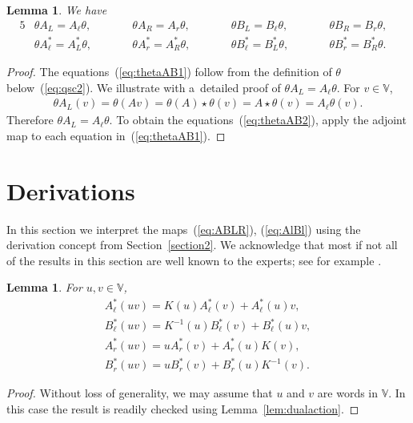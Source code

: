 \documentclass[11pt]{article}
\numberwithin{equation}{section}
\numberwithin{equation}{section}
\newtheorem{Lemma}[Theorem]{Lemma}
\begin{document}
{\begin{Lemma}\label{lem:thetaAB}We have
\begin{alignat}{5}
&\theta A_L = A_\ell \theta,
\qquad &&
\theta A_R = A_r \theta,
\qquad &&
\theta B_L = B_\ell \theta,
\qquad &&
\theta B_R = B_r \theta,&
\label{eq:thetaAB1}
\\
& \theta A^*_\ell = A^*_L \theta,
\qquad &&
\theta A^*_r = A^*_R \theta,
\qquad &&
\theta B^*_\ell = B^*_L \theta,
\qquad &&
\theta B^*_r = B^*_R \theta.&\label{eq:thetaAB2}
\end{alignat}
\end{Lemma}
\begin{proof} The equations~(\ref{eq:thetaAB1}) follow from the definition of $\theta$ below~(\ref{eq:qsc2}). We illustrate with a~detailed proof of $\theta A_L = A_\ell \theta$. For $v \in \mathbb V$,
\begin{gather*}
\theta A_L (v) =
\theta(Av) =
\theta(A) \star \theta(v) =
A \star \theta(v)=
A_\ell \theta (v).
\end{gather*}
Therefore $\theta A_L = A_\ell \theta$. To obtain the equations~(\ref{eq:thetaAB2}), apply the adjoint map to each equation in~(\ref{eq:thetaAB1}).
\end{proof}

\section{Derivations}\label{section8}

In this section we interpret the maps~(\ref{eq:ABLR}),
(\ref{eq:AlBl})
using the derivation concept from
 Section~\ref{section2}. We acknowledge that most if not all of the results in
 this section are well known to the experts; see for example
 \cite[Sections~3 and~4]{green}.

\begin{Lemma}\label{lem:derAs}
For $u,v \in \mathbb V$,
\begin{gather*}
A^*_\ell (uv) =
K(u) A^*_\ell (v)
+A^*_\ell (u)v,
\\
B^*_\ell (uv) =
K^{-1}(u) B^*_\ell (v)+
B^*_\ell (u)v,
\\
A^*_r (uv) =
u A^*_r (v)+
A^*_r (u) K(v),
\\
B^*_r (uv) =
u B^*_r (v)+
B^*_r (u) K^{-1}(v).
\end{gather*}
\end{Lemma}
\begin{proof}Without loss of generality, we may assume that $u$ and $v$ are words in
$\mathbb V$. In this case the result is readily checked using
Lemma~\ref{lem:dualaction}.
\end{proof}

}
\end{document}
